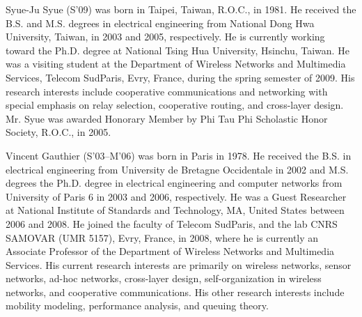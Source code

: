 \documentclass[journal,twoside,final]{IEEEtran}
\begin{document}
\begin{IEEEbiography}{Syue-Ju Syue}
(S\mbox{'}09) was born in Taipei, Taiwan, R.O.C., in 1981. He received the B.S. and M.S. degrees in electrical engineering from National Dong Hwa University, Taiwan, in 2003 and 2005, respectively. He is currently working toward the Ph.D. degree at National Tsing Hua University, Hsinchu, Taiwan. He was a visiting student at the Department of Wireless Networks and Multimedia Services, Telecom SudParis, Evry, France, during the spring semester of 2009. His research interests include cooperative communications and networking with special emphasis on relay selection, cooperative routing, and cross-layer design. Mr. Syue was awarded Honorary Member by Phi Tau Phi Scholastic Honor Society, R.O.C., in 2005.
\end{IEEEbiography}


\begin{IEEEbiography}{Vincent Gauthier}
(S\mbox{'}03--M\mbox{'}06) was born in Paris in 1978. He received the B.S. in electrical engineering from University de Bretagne Occidentale in 2002 and M.S. degrees the Ph.D. degree in electrical engineering and computer networks  from University of Paris 6 in 2003 and 2006, respectively. He was a Guest Researcher at National Institute of Standards and Technology, MA, United States between 2006 and 2008. He joined the faculty of Telecom SudParis, and the lab CNRS SAMOVAR (UMR 5157), Evry, France, in 2008, where he is currently an Associate Professor of the Department of Wireless Networks and Multimedia Services. His current research interests are primarily on wireless networks, sensor networks, ad-hoc networks, cross-layer design, self-organization in wireless networks, and cooperative communications. His other research interests include mobility modeling, performance analysis, and queuing theory.
\end{IEEEbiography}
\end{document}
